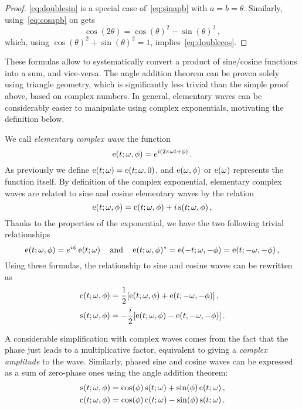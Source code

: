 \begin{proof}
  \cref{eq:doublesin} is a special case of~\cref{eq:sinapb} with $a=b=\theta$. Similarly,
  using~\cref{eq:cosapb} on gets
  \begin{equation}
    \cos(2\theta)=\cos(\theta)^2-\sin(\theta)^2\,,
  \end{equation}
  which, using $\cos(\theta)^2+\sin(\theta)^2=1$, implies~\cref{eq:doublecos}.
\end{proof}
These formulas allow to systematically convert a product of sine/cosine functions into a
sum, and vice-versa. The angle addition theorem can be proven solely using triangle
geometry, which is significantly less trivial than the simple proof above, based on
complex numbers. In general, elementary waves can be considerably easier to manipulate
using complex exponentials, motivating the definition below.
\begin{definition}
  \label{def:complex-wave}
  We call \emph{elementary complex wave} the function
  \begin{equation}
    \operatorname{e}(t;\omega,\phi)=e^{i(2\pi\omega t + \phi)}\,.
  \end{equation}
  As previously we define $\operatorname{e}(t;\omega)=\operatorname{e}(t;\omega,0)$, and $\operatorname{e}(\omega,\phi)$ or
  $\operatorname{e}(\omega)$ represents the function itself. By definition of the complex exponential,
  elementary complex waves are related to sine and cosine elementary waves by the relation
  \begin{equation}
    \operatorname{e}(t;\omega,\phi)=\operatorname{c}(t;\omega,\phi)+i\operatorname{s}(t;\omega,\phi)\,,
  \end{equation}
  Thanks to the properties of the exponential, we have the two following trivial
  relationships
  \begin{equation}
    \operatorname{e}(t;\omega,\phi)=e^{i\phi}\operatorname{e}(t;\omega)\,\quad\text{and}\quad
    \operatorname{e}(t;\omega,\phi)^*=\operatorname{e}(-t;\omega,-\phi)=\operatorname{e}(t;-\omega,-\phi)\,,\label{eq:cw-conj}
  \end{equation}
  Using these formulas, the relationship to sine and cosine waves can be rewritten as
  \begin{align}
    \operatorname{c}(t;\omega,\phi)&=\frac{1}{2}[\operatorname{e}(t;\omega,\phi)+\operatorname{e}(t;-\omega,-\phi)]\,,
    \label{eq:cwtoew}\\
    \operatorname{s}(t;\omega,\phi)&=-\frac{i}{2}[\operatorname{e}(t;\omega,\phi)-\operatorname{e}(t;-\omega,-\phi)]\,.
    \label{eq:swtoew}
  \end{align}
\end{definition}
A considerable simplification with complex waves comes from the fact that the phase just
leads to a multiplicative factor, equivalent to giving a \emph{complex amplitude} to the
wave. Similarly, phased sine and cosine waves can be expressed as a sum of zero-phase ones
using the angle addition theorem:
\begin{align}
  \operatorname{s}(t;\omega,\phi)&=\cos(\phi)\operatorname{s}(t;\omega)+\sin(\phi)\operatorname{c}(t;\omega)\,,\\
  \operatorname{c}(t;\omega,\phi)&=\cos(\phi)\operatorname{c}(t;\omega)-\sin(\phi)\operatorname{s}(t;\omega)\,.
\end{align}
